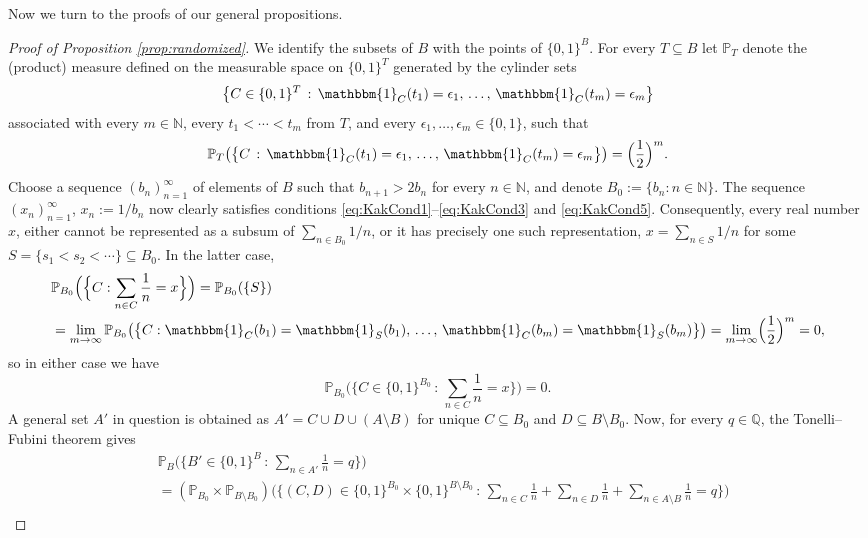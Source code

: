 \documentclass[11pt,letterpaper,reqno]{amsart}
\numberwithin{equation}{section}
\theoremstyle{definition}
\numberwithin{equation}{section}
\begin{document}
Now we turn to the proofs of our general propositions.

\begin{proof}[Proof of Proposition \ref{prop:randomized}]
We identify the subsets of $B$ with the points of $\{0,1\}^B$.
For every $T\subseteq B$ let $\mathbb{P}_T$ denote the (product) measure defined on the measurable space on $\{0,1\}^T$ generated by the cylinder sets
\[ \big\{ C\in\{0,1\}^T \,:\, \mathbbm{1}_{C}(t_1)=\epsilon_1,\, \ldots,\, \mathbbm{1}_{C}(t_m)=\epsilon_m \big\} \]
associated with every $m\in\mathbb{N}$, every $t_1<\cdots<t_m$ from $T$, and every $\epsilon_1,\ldots,\epsilon_m\in\{0,1\}$, such that
\[ \mathbb{P}_T \big(\big\{ C \,:\, \mathbbm{1}_{C}(t_1)=\epsilon_1,\, \ldots,\, \mathbbm{1}_{C}(t_m)=\epsilon_m \big\}\big) = \Bigl(\frac{1}{2}\Bigr)^m. \]
Choose a sequence $(b_n)_{n=1}^{\infty}$ of elements of $B$ such that $b_{n+1}>2b_n$ for every $n\in\mathbb{N}$, and denote $B_0:=\{b_n : n\in\mathbb{N}\}$.
The sequence $(x_n)_{n=1}^{\infty}$, $x_n:=1/b_n$ now clearly satisfies conditions \eqref{eq:KakCond1}--\eqref{eq:KakCond3} and \eqref{eq:KakCond5}. Consequently, every real number $x$, either cannot be represented as a subsum of $\sum_{n\in B_0}1/n$, or it has precisely one such representation, $x=\sum_{n\in S}1/n$ for some $S=\{s_1<s_2<\cdots\}\subseteq B_0$. In the latter case,
\begin{align*}
& \mathbb{P}_{B_0}\Big(\Big\{C : \sum_{n\in C} \frac{1}{n} = x\Big\}\Big)
= \mathbb{P}_{B_0}(\{S\}) \\
& = \lim_{m\to\infty} \mathbb{P}_{B_0}\big(\big\{C : \mathbbm{1}_{C}(b_1)=\mathbbm{1}_{S}(b_1),\,\ldots,\,\mathbbm{1}_{C}(b_m)=\mathbbm{1}_{S}(b_m)\big\}\big)
= \lim_{m\to\infty} \Bigl(\frac{1}{2}\Bigr)^m = 0,
\end{align*}
so in either case we have
\begin{equation}\label{eq:randomisx}
\mathbb{P}_{B_0}\Big(\Big\{C\in\{0,1\}^{B_0} \,:\, \sum_{n\in C} \frac{1}{n} = x\Big\}\Big) = 0.
\end{equation}
A general set $A'$ in question is obtained as $A'=C\cup D\cup (A\setminus B)$ for unique $C\subseteq B_0$ and $D\subseteq B\setminus B_0$.
Now, for every $q\in\mathbb{Q}$, the Tonelli--Fubini theorem gives
\begin{align*}
& \mathbb{P}_B \Big(\Big\{B'\in\{0,1\}^B \,:\, \sum_{n\in A'}\frac{1}{n}=q\Big\}\Big) \\
& = (\mathbb{P}_{B_0}\times\mathbb{P}_{B\setminus B_0}) \Big(\Big\{(C,D)\in\{0,1\}^{B_0}\times\{0,1\}^{B\setminus B_0} \,:\, \sum_{n\in C}\frac{1}{n} + \sum_{n\in D}\frac{1}{n} + \sum_{n\in A\setminus B}\frac{1}{n} = q\Big\}\Big) \\

\end{align*}
\end{proof}
\end{document}
